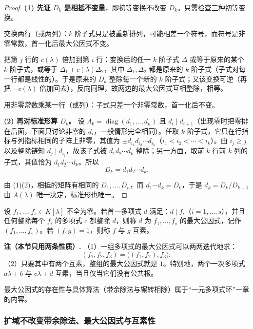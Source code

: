 \begin{proof}
\textbf{(1) 先证 \(D_k\) 是相抵不变量}，即初等变换不改变 \(D_k\)。只需检查三种初等变换。

交换两行（或两列）：\(k\) 阶子式只是被重新排列，可能相差一个符号，而符号是非零常数，首一化后最大公因式不变。

把第 \(j\) 行的 \(c(\lambda)\) 倍加到第 \(i\) 行：变换后的任一 \(k\) 阶子式 \(\Delta\) 或等于原来的某个 \(k\) 阶子式，或等于 \(\Delta_1+c(\lambda)\Delta_2\)，其中 \(\Delta_1,\Delta_2\) 都是原来的 \(k\) 阶子式（子式对每一行都是线性的）。于是原来的 \(D_k\) 整除每一个新的 \(k\) 阶子式；又该变换可逆（再把 \(-c(\lambda)\) 倍加回去），反向同理，故两边的最大公因式互相整除，相等。

用非零常数乘某一行（或列）：子式只差一个非零常数，首一化后不变。

\textbf{(2) 再对标准形算 \(D_k\)。} 设 \(A_0=\operatorname{diag}(d_1,\dots,d_n)\) 且 \(d_i\mid d_{i+1}\)（出现零时把零排在后面，下面只讨论非零的 \(d_i\)，一般情形完全相同）。任取 \(k\) 阶子式，它只在行指标与列指标相同的子阵上非零，其值为 \(\pm d_{i_1}d_{i_2}\cdots d_{i_k}\)（\(i_1<i_2<\cdots<i_k\)）。由 \(i_j\ge j\) 以及整除链知 \(d_j\mid d_{i_j}\)，故该子式被 \(d_1d_2\cdots d_k\) 整除；另一方面，取前 \(k\) 行前 \(k\) 列的子式，其值恰为 \(d_1d_2\cdots d_k\)。所以
\[
D_k=d_1d_2\cdots d_k .
\]

由 (1)(2)，相抵的矩阵有相同的 \(D_1,\dots,D_n\)，而 \(d_1\cdots d_k=D_k\)，于是 \(d_k=D_k/D_{k-1}\) 由 \(A(\lambda)\) 唯一决定，标准形也唯一。
\end{proof}

\begin{definition}[多项式的最大公因式]
设 \(f_1,\dots,f_s\in K[\lambda]\) 不全为零。若首一多项式 \(d\) 满足：\(d\mid f_i\)（\(i=1,\dots,s\)），并且任何整除每个 \(f_i\) 的多项式 \(c\) 都整除 \(d\)，则称 \(d\) 为 \(f_1,\dots,f_s\) 的最大公因式，记作 \((f_1,\dots,f_s)\)。若 \((f,g)=1\)，则称 \(f\) 与 \(g\) 互素。
\end{definition}

\noindent\textbf{注（本节只用两条性质）.}
（1）一组多项式的最大公因式可以两两迭代地求：
\[
(f_1,f_2,f_3)=\bigl((f_1,f_2),f_3\bigr);
\]
（2）只要其中有两个互素，整组的最大公因式就是 \(1\)。特别地，两个一次多项式 \(a\lambda+b\) 与 \(c\lambda+d\) 互素，当且仅当它们没有公共根。

最大公因式的存在性与具体算法（带余除法与辗转相除）属于“一元多项式环”一章的内容。

\subsubsection{扩域不改变带余除法、最大公因式与互素性}

